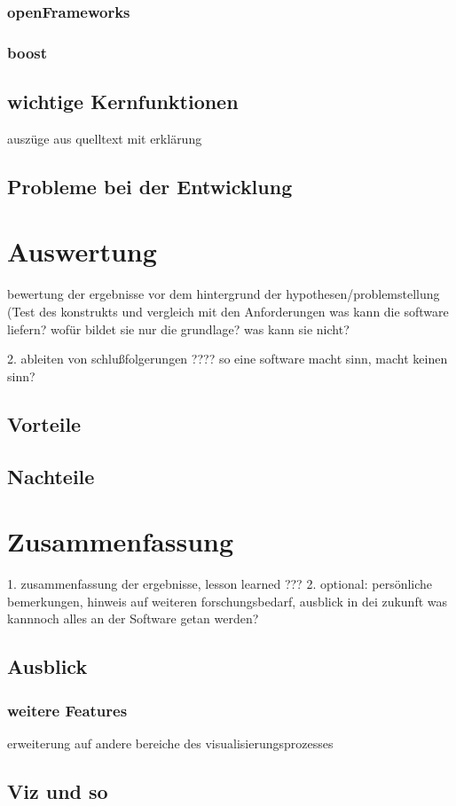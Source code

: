 \documentclass[a4paper, 12pt, onepage, pdftex, headsepline, footsepline]{scrreprt}
\begin{document}
\subsection{openFrameworks}
\subsection{boost}
\section{wichtige Kernfunktionen}
auszüge aus quelltext mit erklärung
\section{Probleme bei der Entwicklung}
\chapter{Auswertung}
bewertung der ergebnisse vor dem hintergrund der hypothesen/problemstellung (Test des konstrukts und vergleich mit den Anforderungen
was kann die software liefern? wofür bildet sie nur die grundlage? was kann sie nicht?

2. ableiten von schlußfolgerungen
????
so eine software macht sinn, macht keinen sinn?
\section{Vorteile}
\section{Nachteile}

\chapter{Zusammenfassung}
1. zusammenfassung der ergebnisse, lesson learned
???
2. optional: persönliche bemerkungen, hinweis auf weiteren forschungsbedarf, ausblick in dei zukunft
was kannnoch alles an der Software getan werden?
\section{Ausblick}
\subsection{weitere Features}
erweiterung auf andere bereiche des visualisierungsprozesses


\section*{Viz und so}
\end{document}
